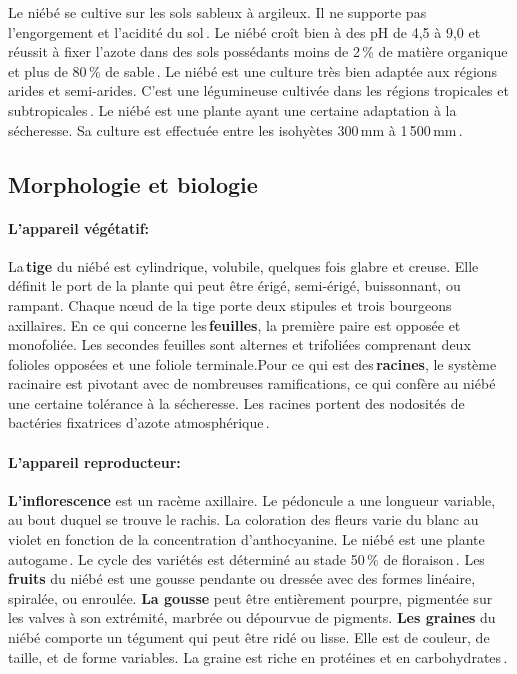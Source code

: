 \documentclass[a4paper,11pt]{article}
\begin{document}
 Le niébé se cultive sur les sols sableux à argileux. Il ne supporte
 pas l’engorgement et l’acidité du sol\,\cite{Doggett_1988}. Le niébé
 croît bien à des pH de 4,5 à 9,0 et réussit à fixer l’azote dans des
 sols possédants moins de 2\,\% de matière organique et plus de 80\,\% de
 sable\,\cite{SINGH_1997}. Le niébé est une culture très bien adaptée
 aux régions arides et semi-arides. C’est une légumineuse cultivée
 dans les régions tropicales et subtropicales\,\cite{Doggett_1988}. Le
 niébé est une plante ayant une certaine adaptation à la
 sécheresse. Sa culture est effectuée entre les isohyètes 300\,mm à
 1\,500\,mm\,\cite{Doggett_1988}.

\subsection{Morphologie et biologie}

  
\paragraph{L’appareil végétatif:}

La\,\textbf{tige} du niébé est cylindrique, volubile, quelques fois
glabre et creuse. Elle définit le port de la plante qui peut être
érigé, semi-érigé, buissonnant, ou rampant. Chaque nœud de la tige
porte deux stipules et trois bourgeons axillaires. En ce qui concerne
les\,\textbf{feuilles}, la première paire est opposée et
monofoliée. Les secondes feuilles sont alternes et trifoliées
comprenant deux folioles opposées et une foliole terminale.Pour ce qui
est des\,\textbf{racines}, le système racinaire est pivotant avec
de nombreuses ramifications, ce qui confère au niébé une certaine
tolérance à la sécheresse. Les racines portent des nodosités de
bactéries fixatrices d’azote atmosphérique\,\cite{Doggett_1988}.



\paragraph{L’appareil reproducteur:}

\textbf{L’inflorescence} est un racème axillaire. Le pédoncule a une
longueur variable, au bout duquel se trouve le rachis. La coloration
des fleurs varie du blanc au violet en fonction de la concentration
d’anthocyanine. Le niébé est une plante autogame\,\cite{Fery}. Le
cycle des variétés est déterminé au stade 50\,\% de
floraison\,\cite{Drabo_1981}. Les\,\textbf{fruits} du niébé est une
gousse pendante ou dressée avec des formes linéaire, spiralée, ou
enroulée. \textbf{La gousse} peut être entièrement pourpre, pigmentée
sur les valves à son extrémité, marbrée ou dépourvue de
pigments. \textbf{Les graines} du niébé comporte un tégument qui peut
être ridé ou lisse. Elle est de couleur, de taille, et de forme
variables. La graine est riche en protéines et en
carbohydrates\,\cite{Doggett_1988}.
\end{document}
